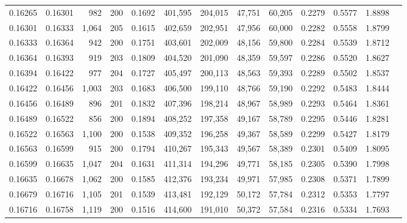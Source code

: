 \begin{tabular}{rrrrrrrrrrrrr}
0.16265 & 0.16301 &   982 & 200 &                                     0.1692 & 401,595 & 204,015 &  47,751 &  60,205 & 0.2279 & 0.5577 & 1.8898 \\
0.16301 & 0.16333 & 1,064 & 205 &                                     0.1615 & 402,659 & 202,951 &  47,956 &  60,000 & 0.2282 & 0.5558 & 1.8799 \\
0.16333 & 0.16364 &   942 & 200 &                                     0.1751 & 403,601 & 202,009 &  48,156 &  59,800 & 0.2284 & 0.5539 & 1.8712 \\
0.16364 & 0.16393 &   919 & 203 &                                     0.1809 & 404,520 & 201,090 &  48,359 &  59,597 & 0.2286 & 0.5520 & 1.8627 \\
0.16394 & 0.16422 &   977 & 204 &                                     0.1727 & 405,497 & 200,113 &  48,563 &  59,393 & 0.2289 & 0.5502 & 1.8537 \\
0.16422 & 0.16456 & 1,003 & 203 &                                     0.1683 & 406,500 & 199,110 &  48,766 &  59,190 & 0.2292 & 0.5483 & 1.8444 \\
0.16456 & 0.16489 &   896 & 201 &                                     0.1832 & 407,396 & 198,214 &  48,967 &  58,989 & 0.2293 & 0.5464 & 1.8361 \\
0.16489 & 0.16522 &   856 & 200 &                                     0.1894 & 408,252 & 197,358 &  49,167 &  58,789 & 0.2295 & 0.5446 & 1.8281 \\
0.16522 & 0.16563 & 1,100 & 200 &                                     0.1538 & 409,352 & 196,258 &  49,367 &  58,589 & 0.2299 & 0.5427 & 1.8179 \\
0.16563 & 0.16599 &   915 & 200 &                                     0.1794 & 410,267 & 195,343 &  49,567 &  58,389 & 0.2301 & 0.5409 & 1.8095 \\
0.16599 & 0.16635 & 1,047 & 204 &                                     0.1631 & 411,314 & 194,296 &  49,771 &  58,185 & 0.2305 & 0.5390 & 1.7998 \\
0.16635 & 0.16678 & 1,062 & 200 &                                     0.1585 & 412,376 & 193,234 &  49,971 &  57,985 & 0.2308 & 0.5371 & 1.7899 \\
0.16679 & 0.16716 & 1,105 & 201 &                                     0.1539 & 413,481 & 192,129 &  50,172 &  57,784 & 0.2312 & 0.5353 & 1.7797 \\
0.16716 & 0.16758 & 1,119 & 200 &                                     0.1516 & 414,600 & 191,010 &  50,372 &  57,584 & 0.2316 & 0.5334 & 1.7693 \\

\end{tabular}

